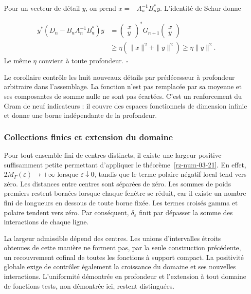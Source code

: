 Pour un vecteur de détail \(y\), on prend \(x=-A_n^{-1}B_n^*y\). L'identité de Schur donne

\[
\begin{aligned}
y^*(D_n-B_nA_n^{-1}B_n^*)y
&=\begin{pmatrix}x\\y\end{pmatrix}^*G_{n+1}
\begin{pmatrix}x\\y\end{pmatrix}\\
&\geq\eta(\|x\|^2+\|y\|^2)\geq\eta\|y\|^2.
\end{aligned}
\]
Le même \(\eta\) convient à toute profondeur. \hfill\(\square\)

Le corollaire contrôle les huit nouveaux détails par prédécesseur à profondeur arbitraire dans l'assemblage. La fonction n'est pas remplacée par sa moyenne et ses composantes de somme nulle ne sont pas écartées. C'est un renforcement du Gram de neuf indicateurs : il couvre des espaces fonctionnels de dimension infinie et donne une borne indépendante de la profondeur.

\subsubsection*{Collections finies et extension du domaine}
Pour tout ensemble fini de centres distincts, il existe une largeur positive suffisamment petite permettant d'appliquer le théorème~\ref{rz-num-03-21}. En effet, \(2M_\Gamma(\varepsilon)\to+\infty\) lorsque \(\varepsilon\downarrow0\), tandis que le terme polaire négatif local tend vers zéro. Les distances entre centres sont séparées de zéro. Les sommes de poids premiers restent bornées lorsque chaque fenêtre se réduit, car il existe un nombre fini de longueurs en dessous de toute borne fixée. Les termes croisés gamma et polaire tendent vers zéro. Par conséquent, \(\delta_\varepsilon\) finit par dépasser la somme des interactions de chaque ligne.

La largeur admissible dépend des centres. Les unions d’intervalles étroits obtenues de cette manière ne forment pas, par la seule construction précédente, un recouvrement cofinal de toutes les fonctions à support compact. La positivité globale exige de contrôler également la croissance du domaine et ses nouvelles interactions. L’uniformité démontrée en profondeur et l’extension à tout domaine de fonctions tests, non démontrée ici, restent distinguées.

